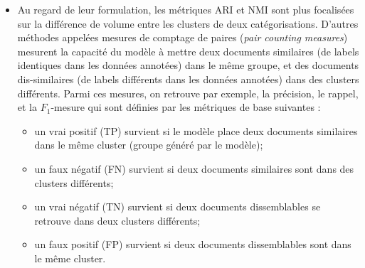\begin{itemize}
	\item Au regard de leur formulation, les métriques ARI et NMI sont plus focalisées sur la différence de volume entre les clusters de deux catégorisations. D'autres méthodes appelées  \og mesures de comptage de paires \fg{} (\textit{pair counting measures}) mesurent la capacité du modèle à mettre deux documents similaires (de labels identiques dans les données annotées) dans le même groupe, et des documents dis-similaires (de labels différents dans les données annotées) dans des clusters différents. Parmi ces mesures, on retrouve par exemple, la précision, le rappel, et la $F_1$-mesure qui sont définies par les métriques de base suivantes \citep{manning2009irbook-flatclustering}:
	\begin{itemize}
		\item un vrai positif (TP) survient si le modèle place deux documents similaires dans le même cluster (groupe généré par le modèle);
		\item un faux négatif (FN) survient si deux documents similaires sont dans des clusters différents;
		\item un vrai négatif (TN) survient si deux documents dissemblables se retrouve dans deux clusters différents;
		\item un faux positif (FP) survient si deux documents dissemblables sont dans le même cluster.
	\end{itemize}
		
\end{itemize}



